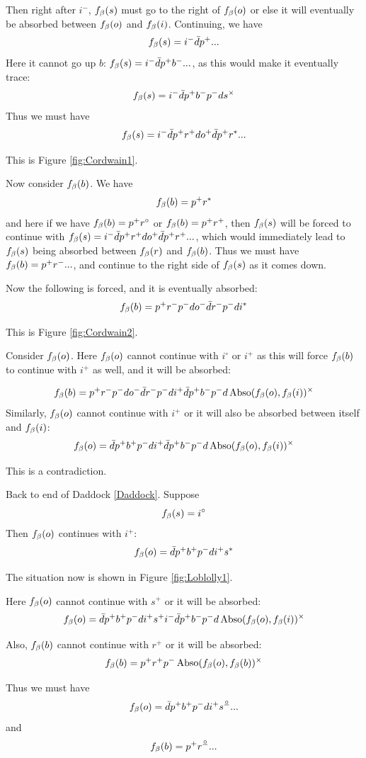Then right after $i^-$, $f_\beta(s)$ must go to the right of $f_\beta(o)$ or else it will eventually be absorbed between $f_\beta(o)$ and $f_\beta(i)$. Continuing, we have
\[
f_\beta(s) = i^- \bar{d} p^+...
\]
Here it cannot go up $b$: $f_\beta(s) = i^- \bar{d} p^+ b^-...$, as this would make it eventually trace:
\[
f_\beta(s) = i^- \bar{d} p^+ b^-p^- d s^\times
\]
Thus we must have
\[
f_\beta(s) = i^- \bar{d} p^+r^+ d o^+ \bar{d} p^+r^*...
\]

This is Figure \ref{fig:Cordwain1}.

Now consider $f_\beta(b)$. We have
\[
f_\beta(b) = p^+r^*
\]
and here if we have $f_\beta(b) = p^+r^\circ$ or $f_\beta(b) = p^+r^+$, then $f_\beta(s)$ will be forced to continue with $f_\beta(s) = i^- \bar{d} p^+r^+ d o^+ \bar{d} p^+r^+...$, which would immediately lead to $f_\beta(s)$ being absorbed between $f_\beta(r)$ and $f_\beta(b)$. Thus we must have $f_\beta(b) = p^+r^-...$, and continue to the right side of $f_\beta(s)$ as it comes down.


Now the following is forced, and it is eventually absorbed:
\[
f_\beta(b) = p^+r^-p^- d o^- \bar{d} r^-p^- d i^*
\]

This is Figure \ref{fig:Cordwain2}.

Consider $f_\beta(o)$. Here $f_\beta(o)$ cannot continue with $i^\circ$ or $i^+$ as this will force $f_\beta(b)$ to continue with $i^+$ as well, and it will be absorbed:

\[
f_\beta(b) = p^+r^-p^- d o^- \bar{d} r^-p^- d i^+\bar{d} p^+ b^- p^- d \operatorname{Abso}(f_\beta(o), f_\beta(i))^\times
\]
Similarly, $f_\beta(o)$ cannot continue with $i^+$ or it will also be absorbed between itself and $f_\beta(i)$:
\[
f_\beta(o) = \bar{d} p^+ b^+ p^- d i^+\bar{d} p^+b^-p^- d \operatorname{Abso}(f_\beta(o), f_\beta(i))^\times
\]

This is a contradiction.


\label{Loblolly}
Back to end of Daddock \ref{Daddock}. Suppose 
\[
f_\beta(s) = i^\circ
\]
Then $f_\beta(o)$ continues with $i^+$:
\[
f_\beta(o) = \bar{d} p^+ b^+ p^- d i^+ s^*
\]

The situation now is shown in Figure \ref{fig:Loblolly1}.


Here $f_\beta(o)$ cannot continue with $s^+$ or it will be absorbed:
\[
f_\beta(o) = \bar{d} p^+ b^+ p^- d i^+ s^+ i^- \bar{d} p^+b^- p^- d \operatorname{Abso}(f_\beta(o), f_\beta(i))^\times
\]

Also, $f_\beta(b)$ cannot continue with $r^+$ or it will be absorbed:
\[
f_\beta(b) = p^+ r^+ p^- \operatorname{Abso}(f_\beta(o), f_\beta(b))^\times
\]

Thus we must have 
\[
f_\beta(o) = \bar{d} p^+ b^+ p^- d i^+ s^{\substack{\circ \\[ -3pt] -}}...
\]
and
\[
f_\beta(b) = p^+r^{\substack{\circ \\[ -3pt] -}}...
\]

